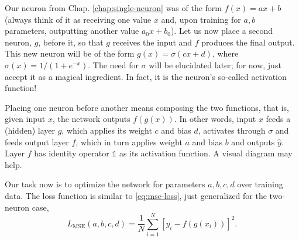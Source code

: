 \documentclass[11pt,a4paper,oneside]{book}
\theoremstyle{definition}
\theoremstyle{plain}
\theoremstyle{remark}
\begin{document}
Our neuron from Chap. \ref{chap:single-neuron} was of the form $f(x)=ax+b$ (always think of it as receiving one value $x$ and, upon training for $a,b$ parameters, outputting another value $a_0x+b_0$). Let us now place a second neuron, $g$, before it, so that $g$ receives the input and $f$ produces the final output. This new neuron will be of the form $g(x) = \sigma(cx+d)$, where $\sigma(x)=1/(1+e^{-x})$. The need for $\sigma$ will be elucidated later; for now, just accept it as a magical ingredient. In fact, it is the neuron's so-called activation function!

Placing one neuron before another means composing the two functions, that is, given input $x$, the network outputs $f(g(x))$. In other words, input $x$ feeds a (hidden) layer $g$, which applies its weight $c$ and bias $d$, activates through $\sigma$ and feeds output layer $f$, which in turn applies weight $a$ and bias $b$ and outputs $\hat y$. Layer $f$ has identity operator $\mathds{1}$ as its activation function. A visual diagram may help.

\begin{figure}[h]
    \centering
    \label{fig:two-neuron-network}
\end{figure}

Our task now is to optimize the network for parameters $a,b,c,d$ over training data. The loss function is similar to \eqref{eq:mse-loss}, just generalized for the two-neuron case,
\begin{equation}
    \label{eq:mse-loss4}
    L_\text{MSE}(a,b,c,d) = \frac{1}{N}\sum_{i=1}^N[y_i - f(g(x_i))]^2.
\end{equation}
\end{document}
